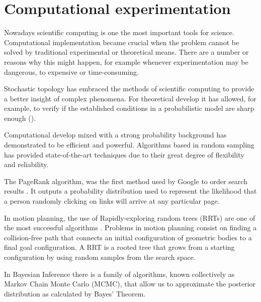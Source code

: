 
\chapter{Computational experimentation} %

\label{Chapter3} %



Nowadays scientific computing is one the most important tools for science. Computational implementation became crucial when the problem cannot be solved by traditional experimental or theoretical means. There are a number or reasons why this might happen, for example whenever experimentation may be dangerous, to expensive or time-consuming.

Stochastic topology has embraced the methods of scientific computing to provide a better insight of complex phenomena. For theoretical develop it has allowed, for example, to verify if the established conditions in a probabilistic model are sharp enough (\cite{Meshulam13}). 

Computational develop mixed with a strong probability background has demonstrated to be efficient and powerful. Algorithms based in random sampling has provided state-of-the-art techniques due to their great degree of flexibility and reliability.

The PageRank algorithm, was the first method used by Google to order search results \cite{pageRank}. It outputs a probability distribution used to represent the likelihood that a person randomly clicking on links will arrive at any particular page.

In motion planning, the use of Rapidly-exploring random trees (RRTs) are one of the most successful algorithms \cite{Alcazar15}. Problems in motion planning consist on finding a collision-free path that connects an initial configuration of geometric bodies to a final goal configuration. A RRT is a rooted tree that grows from a starting configuration by using random samples from the search space. 

In Bayesian Inference there is a family of algorithms, known collectively as Markov Chain Monte Carlo (MCMC), that allow us to approximate the posterior distribution as calculated by Bayes' Theorem.

